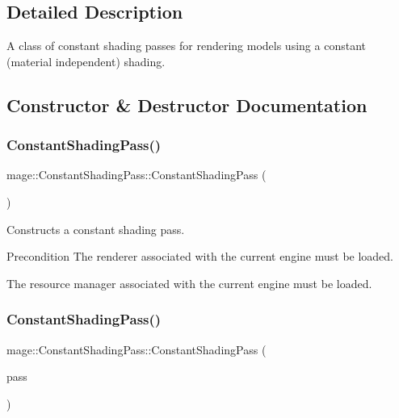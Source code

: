 \subsection{Detailed Description}
A class of constant shading passes for rendering models using a constant (material independent) shading. 

\subsection{Constructor \& Destructor Documentation}
\hypertarget{classmage_1_1_constant_shading_pass_a21a8614cd67999bec82d260eb9aa78d7}{}\label{classmage_1_1_constant_shading_pass_a21a8614cd67999bec82d260eb9aa78d7} 
\subsubsection{\texorpdfstring{Constant\+Shading\+Pass()}{ConstantShadingPass()}\hspace{0.1cm}{\footnotesize\ttfamily [1/3]}}
{\footnotesize\ttfamily mage\+::\+Constant\+Shading\+Pass\+::\+Constant\+Shading\+Pass (\begin{DoxyParamCaption}{ }\end{DoxyParamCaption})}

Constructs a constant shading pass.

\begin{DoxyPrecond}{Precondition}
The renderer associated with the current engine must be loaded. 

The resource manager associated with the current engine must be loaded. 
\end{DoxyPrecond}
\hypertarget{classmage_1_1_constant_shading_pass_aa1f3b7bd78ba5cbd2bfd77cc8871895a}{}\label{classmage_1_1_constant_shading_pass_aa1f3b7bd78ba5cbd2bfd77cc8871895a} 
\subsubsection{\texorpdfstring{Constant\+Shading\+Pass()}{ConstantShadingPass()}\hspace{0.1cm}{\footnotesize\ttfamily [2/3]}}
{\footnotesize\ttfamily mage\+::\+Constant\+Shading\+Pass\+::\+Constant\+Shading\+Pass (\begin{DoxyParamCaption}\item[{const \hyperlink{classmage_1_1_constant_shading_pass}{Constant\+Shading\+Pass} \&}]{pass }\end{DoxyParamCaption})\hspace{0.3cm}{\ttfamily [delete]}}

